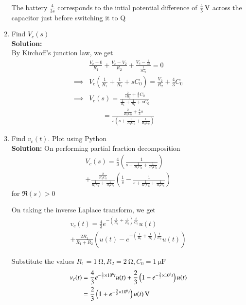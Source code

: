 \documentclass[journal,12pt,twocolumn]{IEEEtran}
\newcommand{\solution}{\noindent \textbf{Solution: }}
\providecommand{\brak}[1]{\ensuremath{\left(#1\right)}}
\numberwithin{equation}{section}
\numberwithin{figure}{section}
\renewcommand\thesection{\arabic{section}}
\begin{document}
\begin{enumerate}[label=\thesection.\arabic*,ref=\thesection.\theenumi]
			The battery $\frac{4}{3s}$ corresponds to the intial potential difference of $\SI[parse-numbers=false]{\frac43}{\volt}$ across the capacitor just before switching it to Q\\
			
		\item Find $V_c(s)$\\
	
		\solution\\
			By Kirchoff's junction law, we get
			\begin{align}
				&\frac{V_c - 0}{R_1} + 	\frac{V_c - V_2}{R_2} + \frac{V_c - \frac{4}{3s}}{\frac{1}{sC_0}} = 0 \\
				\implies &V_c \brak{\frac{1}{R_1} + \frac{1}{R_2} + sC_0} =  \frac{V_2}{R_2} + \frac{4}{3}C_0 \\
				\implies &V_c(s) = \frac{\frac{2}{sR_2} + \frac{4}{3}C_0}{\frac{1}{R_1} + \frac{1}{R_2} + sC_0} \\
				&\qquad = \frac{\frac{2}{R_2C_0} + \frac43 s}{s\brak{s + \frac{1}{R_1C_0} + \frac{1}{R_2C_0}}} 
			\end{align}
		
		\item Find $v_c(t)$. Plot using Python\\
	
		\solution On performing partial fraction decomposition
			\begin{multline}
				V_{c}(s) = \frac{4}{3}\brak{\frac{1}{s + \frac{1}{R_1C_0} + \frac{1}{R_2C_0}}} \\
				+ \frac{\frac{2}{R_2C_0}}{\frac{1}{R_1C_0} +\frac{1}{R_2C_0}}\brak{\frac{1}{s} - \frac{1}{s + \frac{1}{R_1C_0} + \frac{1}{R_2C_0}}} 
			\end{multline}
			for $\Re(s) > 0$
	
			On taking the inverse Laplace transform, we get
			\begin{multline}
				v_c(t) = \frac{4}{3}e^{-\brak{\frac{1}{R_1} + \frac{1}{R_2}}\frac{t}{C_0}}u(t) \\
				+ \frac{2R_1}{R_1 + R_2} \brak{u(t) - e^{-\brak{\frac{1}{R_1} + \frac{1}{R_2}}\frac{t}{C_0}}u(t) } 
			\end{multline}
	
			Substitute the values $R_1 = \SI{1}{\ohm}, R_2 = \SI{2}{\ohm}, C_0 = \SI{1}{\micro\farad}$
			\begin{align}
				v_c(t) &= \frac43 e^{-\frac{3}{2} \times 10^6 t}u(t) + \frac{2}{3}\brak{1 - e^{-\frac{3}{2} \times 10^6 t}}u(t) \\
				&= \SI[parse-numbers=false]{\frac{2}{3} \brak{1 + e^{-\frac{3}{2} \times 10^6 t}} u(t)}{\volt}
			\end{align}
			

\end{enumerate}
\end{document}
